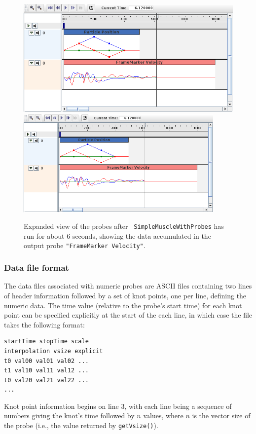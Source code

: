 \begin{figure}[ht]
\begin{center}
\iflatexml
 \includegraphics[]{images/timelineProbesExpanded}
\else
 \includegraphics[width=4in]{images/timelineProbesExpanded}
\fi
\end{center}
\caption{Expanded view of the probes after {\tt
SimpleMuscleWithProbes} has run for about 6 seconds, showing the data
accumulated in the output probe {\tt "FrameMarker Velocity"}.}
\label{probesExpanded:fig}
\end{figure}

\subsubsection{Data file format}
\label{DataFileFormat:sec}

The data files associated with numeric probes are ASCII files
containing two lines of header information followed by a set of knot
points, one per line, defining the numeric data. The time value
(relative to the probe's start time) for each knot point can be
specified explicitly at the start of the each line, in which case the
file takes the following format:
%
\begin{lstlisting}[]
startTime stopTime scale
interpolation vsize explicit
t0 val00 val01 val02 ...
t1 val10 val11 val12 ...
t0 val20 val21 val22 ...
...
\end{lstlisting}
%
Knot point information begins on line 3, with each line being a
sequence of numbers giving the knot's time followed by $n$ values,
where $n$ is the vector size of the probe (i.e., the value returned by
{\tt getVsize()}).

